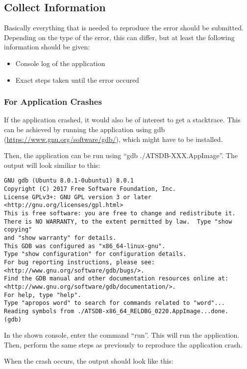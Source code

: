 \subsection{Collect Information}

Basically everything that is needed to reproduce the error should be submitted. Depending on the type of the error, this can differ, but at least the following information should be given:

\begin{itemize}  
\item Console log of the application
\item Exact steps taken until the error occured
\end{itemize} 

\subsubsection{For Application Crashes}

If the application crashed, it would also be of interest to get a stacktrace. This can be achieved by running the application using gdb (\url{https://www.gnu.org/software/gdb/}), which might have to be installed.

Then, the application can be run using ``gdb ./ATSDB-XXX.AppImage''. The output will look similiar to this:

\begin{verbatim}
GNU gdb (Ubuntu 8.0.1-0ubuntu1) 8.0.1
Copyright (C) 2017 Free Software Foundation, Inc.
License GPLv3+: GNU GPL version 3 or later <http://gnu.org/licenses/gpl.html>
This is free software: you are free to change and redistribute it.
There is NO WARRANTY, to the extent permitted by law.  Type "show copying"
and "show warranty" for details.
This GDB was configured as "x86_64-linux-gnu".
Type "show configuration" for configuration details.
For bug reporting instructions, please see:
<http://www.gnu.org/software/gdb/bugs/>.
Find the GDB manual and other documentation resources online at:
<http://www.gnu.org/software/gdb/documentation/>.
For help, type "help".
Type "apropos word" to search for commands related to "word"...
Reading symbols from ./ATSDB-x86_64_RELDBG_0220.AppImage...done.
(gdb) 
\end{verbatim}


In the shown console, enter the command ``run''. This will run the application. Then, perform the same steps as previously to reproduce the application crash.

When the crash occurs, the output should look like this:

